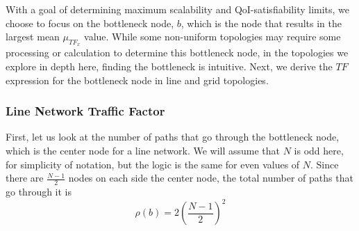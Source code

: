


With a goal of determining maximum scalability and QoI-satisfiability limits, we choose to focus on the bottleneck node, $b$, which is the node that results in the largest mean $\mu_{TF_x}$ value.  While some non-uniform topologies may require some processing or calculation to determine this bottleneck node, in the topologies we explore in depth here, finding the bottleneck is intuitive.  
Next, we derive the $TF$ expression for the bottleneck node in line and grid topologies.  

\subsubsection{Line Network Traffic Factor}

First, let us look at the number of paths that go through the bottleneck node, which is the center node for a line network.  We will assume that $N$ is odd here, for simplicity of notation, but the logic is the same for even values of $N$.  Since there are $\frac{N-1}{2}$ nodes on each side the center node, the total number of paths that go through it is
\begin{equation*}
	\rho(b) = 2(\frac{N-1}{2})^2
\end{equation*}

